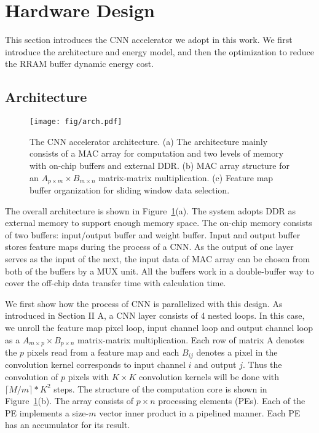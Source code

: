 \section{Hardware Design}\label{sec:hw}
This section introduces the CNN accelerator we adopt in this work. We first introduce the architecture and energy model, and then the optimization to reduce the RRAM buffer dynamic energy cost.

\subsection{Architecture}\label{sec:hw:arch}

\begin{figure}[t]
  \centering
  \texttt{[image: fig/arch.pdf]}
  \vspace{-10pt}
  \caption{The CNN accelerator architecture. (a) The architecture mainly consists of a MAC array for computation and two levels of memory with on-chip buffers and external DDR. (b) MAC array structure for an $A_{p\times m}\times B_{m\times n}$ matrix-matrix multiplication. (c) Feature map buffer organization for sliding window data selection.}
  \vspace{-15pt}
  \label{fig:arch}
\end{figure}

The overall architecture is shown in Figure~\ref{fig:arch}(a). The system adopts DDR as external memory to support enough memory space. The on-chip memory consists of two buffers: input/output buffer and weight buffer. Input and output buffer stores feature maps during the process of a CNN. As the output of one layer serves as the input of the next, the input data of MAC array can be chosen from both of the buffers by a MUX unit. All the buffers work in a double-buffer way to cover the off-chip data transfer time with calculation time.

We first show how the process of CNN is parallelized with this design. As introduced in Section II A, a CNN layer consists of 4 nested loops. In this case, we unroll the feature map pixel loop, input channel loop and output channel loop as a $A_{m\times p}\times B_{p\times n}$ matrix-matrix multiplication. Each row of matrix A denotes the $p$ pixels read from a feature map and each $B_{ij}$ denotes a pixel in the convolution kernel corresponds to input channel $i$ and output $j$. Thus the convolution of $p$ pixels with $K\times K$ convolution kernels will be done with $\lceil M/m\rceil*K^2$ steps. The structure of the computation core is shown in Figure~\ref{fig:arch}(b). The array consists of $p\times n$ processing elements (PEs). Each of the PE implements a size-$m$ vector inner product in a pipelined manner. Each PE has an accumulator for its result. 

